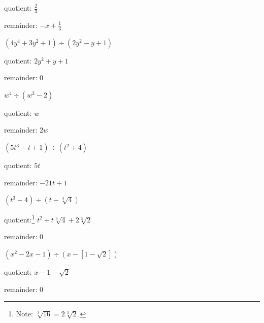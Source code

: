 \documentclass{ximera}
\begin{document}
\begin{question}
\begin{problem}
\begin{solution}
     quotient: $\frac{2}{3}$
     
     remainder: $-x + \frac{1}{3}$
\end{solution}
\end{problem}

\begin{problem}
$(4y^4+3y^2+1) \div (2y^2-y+1)$

\begin{solution}
     quotient:  $2y^2+y+1$
     
     remainder: $0$
\end{solution}
\end{problem}

\begin{problem}
$w^4 \div (w^3 - 2)$

\begin{solution}
    quotient: $w$
    
    remainder: $2w$
\end{solution}
\end{problem}

\begin{problem}
$(5t^3 - t + 1) \div (t^2 + 4)$

\begin{solution}
    quotient: $5t$
    
    remainder: $-21t + 1$
\end{solution}
\end{problem}

\begin{problem}
$(t^3 - 4) \div (t - \sqrt[3]{4})$

\begin{solution}
    quotient:\footnote{Note: $\sqrt[3]{16} = 2\sqrt[3]{2}$.} $t^2 + t \sqrt[3]{4} + 2\sqrt[3]{2}$
    
    remainder: $0$
\end{solution}
\end{problem}

\begin{problem}\label{polydivexlast}
$(x^2-2x-1) \div (x-[1-\sqrt{2}])$

\begin{solution}
    quotient: $x -1 - \sqrt{2}$
    
    remainder: 0 
\end{solution}
\end{problem}

\end{question}
\end{document}
